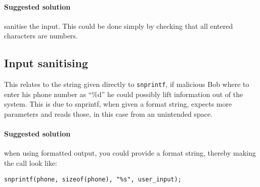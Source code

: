 \paragraph{Suggested solution} sanitise the input. This could be done simply by
checking that all entered characters are numbers.

\subsection{Input sanitising}
This relates to the string given directly to \texttt{snprintf}, if malicious
Bob where to enter his phone number as ``\%d'' he could possibly lift
information out of the system. This is due to snprintf, when given a format
string, expects more parameters and reads those, in this case from an
unintended space.

\paragraph{Suggested solution} when using formatted output, you could provide a
format string, thereby making the call look like: 

\begin{center}
\texttt{snprintf(phone, sizeof(phone), "\%s", user\_input);}
\end{center}
